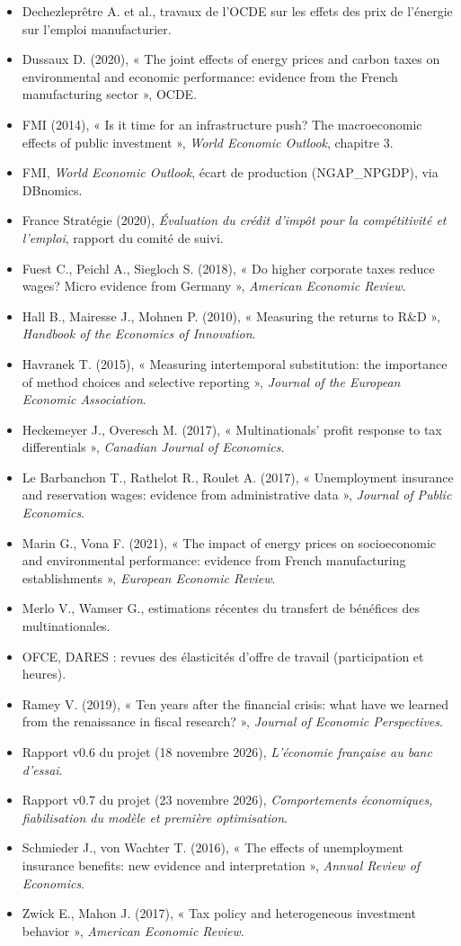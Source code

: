\begin{itemize}
\item Dechezleprêtre A. et al., travaux de l'OCDE sur les effets des prix de l'énergie sur l'emploi manufacturier.
\item Dussaux D. (2020), « The joint effects of energy prices and carbon taxes on environmental and economic performance: evidence from the French manufacturing sector », OCDE.
\item FMI (2014), « Is it time for an infrastructure push? The macroeconomic effects of public investment », \emph{World Economic Outlook}, chapitre 3.
\item FMI, \emph{World Economic Outlook}, écart de production (NGAP\_NPGDP), via DBnomics.
\item France Stratégie (2020), \emph{Évaluation du crédit d'impôt pour la compétitivité et l'emploi}, rapport du comité de suivi.
\item Fuest C., Peichl A., Siegloch S. (2018), « Do higher corporate taxes reduce wages? Micro evidence from Germany », \emph{American Economic Review}.
\item Hall B., Mairesse J., Mohnen P. (2010), « Measuring the returns to R\&D », \emph{Handbook of the Economics of Innovation}.
\item Havranek T. (2015), « Measuring intertemporal substitution: the importance of method choices and selective reporting », \emph{Journal of the European Economic Association}.
\item Heckemeyer J., Overesch M. (2017), « Multinationals' profit response to tax differentials », \emph{Canadian Journal of Economics}.
\item Le Barbanchon T., Rathelot R., Roulet A. (2017), « Unemployment insurance and reservation wages: evidence from administrative data », \emph{Journal of Public Economics}.
\item Marin G., Vona F. (2021), « The impact of energy prices on socioeconomic and environmental performance: evidence from French manufacturing establishments », \emph{European Economic Review}.
\item Merlo V., Wamser G., estimations récentes du transfert de bénéfices des multinationales.
\item OFCE, DARES : revues des élasticités d'offre de travail (participation et heures).
\item Ramey V. (2019), « Ten years after the financial crisis: what have we learned from the renaissance in fiscal research? », \emph{Journal of Economic Perspectives}.
\item Rapport v0.6 du projet (18 novembre 2026), \emph{L'économie française au banc d'essai}.
\item Rapport v0.7 du projet (23 novembre 2026), \emph{Comportements économiques, fiabilisation du modèle et première optimisation}.
\item Schmieder J., von Wachter T. (2016), « The effects of unemployment insurance benefits: new evidence and interpretation », \emph{Annual Review of Economics}.
\item Zwick E., Mahon J. (2017), « Tax policy and heterogeneous investment behavior », \emph{American Economic Review}.
\end{itemize}

